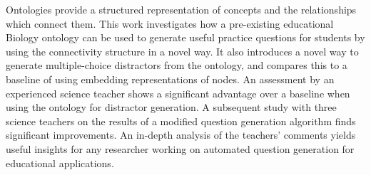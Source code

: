 Ontologies provide a structured representation of concepts and the relationships which connect them. This work investigates how a pre-existing educational Biology ontology can be used to generate useful practice questions for students by using the connectivity structure in a novel way. It also introduces a novel way to generate multiple-choice distractors from the ontology, and compares this to a baseline of using embedding representations of nodes. An assessment by an experienced science teacher shows a significant advantage over a baseline when using the ontology for distractor generation. A subsequent study with three science teachers on the results of a modified question generation algorithm finds significant improvements. An in-depth analysis of the teachers' comments yields useful insights for any researcher working on automated question generation for educational applications.
